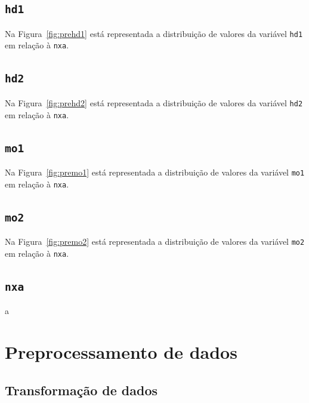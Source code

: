 \documentclass[10pt, conference, compsocconf]{IEEEtran}
\begin{document}

\subsection{\texttt{hd1}}
Na Figura~\ref{fig:prehd1} está representada a distribuição de valores
da variável {\tt hd1} em relação à {\tt nxa}.


\subsection{\texttt{hd2}}
Na Figura~\ref{fig:prehd2} está representada a distribuição de valores
da variável {\tt hd2} em relação à {\tt nxa}.


\subsection{\texttt{mo1}}
Na Figura~\ref{fig:premo1} está representada a distribuição de valores
da variável {\tt mo1} em relação à {\tt nxa}.


\subsection{\texttt{mo2}}
Na Figura~\ref{fig:premo2} está representada a distribuição de valores
da variável {\tt mo2} em relação à {\tt nxa}.


\subsection{\texttt{nxa}}
a


\section{Preprocessamento de dados}
\label{sec:pre}

\lipsum[1]


\subsection{Transformação de dados}
\end{document}
